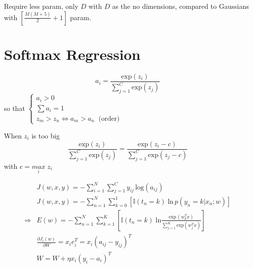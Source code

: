 \note Require less \ac{param}, only $D$ with $D$ as the \ac{no} dimensions, compared to Gaussians with $\displaystyle \left[\frac{M(M+5)}{2}+1\right]$ \ac{param}.

\section{Softmax Regression}


\begin{equation}
	a_i = \frac{\text{exp}(z_i)}{\sum_{j=1}^{C}\text{exp}(z_j)}
\end{equation}
so that $\begin{cases}
	a_i > 0 \\
	\sum a_i = 1 \\
	z_m > z_n \iff a_m > a_n \;\;\text{(order)}
\end{cases}$

When $z_i$ is too big
\begin{equation}
	\frac{\text{exp}(z_i)}{\sum_{j=1}^{C}\text{exp}(z_j)} = \frac{\text{exp}(z_i - c)}{\sum_{j=1}^{C}\text{exp}(z_j - c)}
\end{equation}
with $c = \underset{i}{max}\;z_i$

\begin{align}
	&J(w,x,y) = - \sum_{i=1}^{N} \sum_{j=1}^{C} y_{ij}\,\text{log}(a_{ij}) \\
	&J(w,x,y) = - \sum_{n=1}^{N} \sum_{k=0}^{1} \left[ \mathbb{I}(t_n=k)\; \text{ln}\,p(y_n=k | x_n; w) \right] \\
	\Rightarrow &E(w) = - \sum_{n=1}^{N} \sum_{k=1}^{K} \left[ \mathbb{I}(t_n=k)\; \text{ln}\frac{\text{exp}\,(w_k^T x)}{\sum_{j=1}^{K} \text{exp}(w_j^T x)} \right] \\
	&\frac{\partial J_i(w)}{\partial W} = x_i e_i^T = x_i (a_{ij} - y_{ij})^T \\
	&W = W + \eta x_i (y_i - a_i)^T
\end{align}